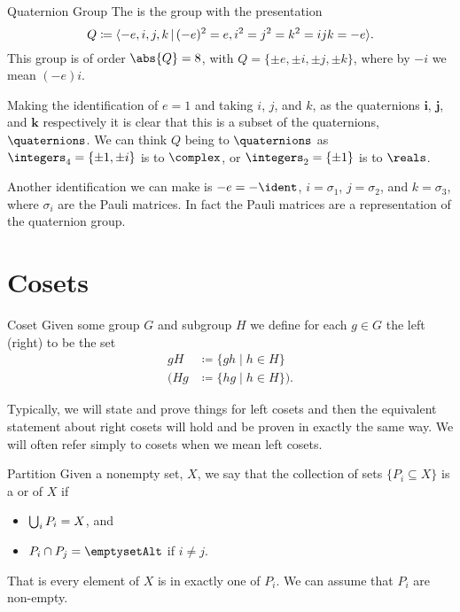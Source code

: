 \begin{exm}{Quaternion Group}{}
    The  is the group with the presentation
    \begin{equation}
        Q \coloneqq \presentation{-e, i, j, k}{(-e)^2 = e, i^2 = j^2 = k^2 = ijk = -e}.
    \end{equation}
    This group is of order \(\abs{Q} = 8\), with \(Q = \{\pm e, \pm i, \pm j, \pm k\}\), where by \(-i\) we mean \((-e)i\).
    
    Making the identification of \(e = 1\) and taking \(i\), \(j\), and \(k\), as the quaternions \(\mathbf{i}\), \(\mathbf{j}\), and \(\mathbf{k}\) respectively it is clear that this is a subset of the quaternions, \(\quaternions\).
    We can think \(Q\) being to \(\quaternions\) as \(\integers_4 = \{\pm 1, \pm i\}\) is to \(\complex\), or \(\integers_2 = \{\pm 1\}\) is to \(\reals\).
    
    Another identification we can make is \(-e = -\ident\), \(i = \sigma_1\), \(j = \sigma_2\), and \(k = \sigma_3\), where \(\sigma_i\) are the Pauli matrices.
    In fact the Pauli matrices are a representation of the quaternion group.
\end{exm}

\section{Cosets}
\begin{dfn}{Coset}{}
    Given some group \(G\) and subgroup \(H\) we define for each \(g \in G\) the left (right)  to be the set
    \begin{align}
        gH &\coloneqq \{gh \mid h \in H\}\\
        (Hg &\coloneqq \{hg \mid h \in H\}).
    \end{align}
\end{dfn}

Typically, we will state and prove things for left cosets and then the equivalent statement about right cosets will hold and be proven in exactly the same way.
We will often refer simply to cosets when we mean left cosets.

\begin{dfn}{Partition}{}
    Given a nonempty set, \(X\), we say that the collection of sets \(\{P_i \subseteq X\}\) is a  or  of \(X\) if
    \begin{itemize}
        \item \(\bigcup_i P_i = X\), and
        \item \(P_i \intersection P_j = \emptyset\) if \(i \ne j\).
    \end{itemize}
    That is every element of \(X\) is in exactly one of \(P_i\).
    We can assume that \(P_i\) are non-empty.
\end{dfn}


